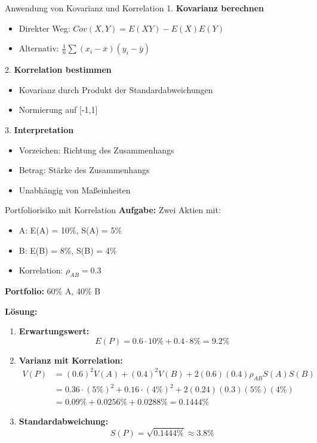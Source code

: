 \begin{KR}{Anwendung von Kovarianz und Korrelation}
1. \textbf{Kovarianz berechnen}
   \begin{itemize}
   \item Direkter Weg: $Cov(X,Y) = E(XY) - E(X)E(Y)$
   \item Alternativ: $\frac{1}{n}\sum(x_i-\bar{x})(y_i-\bar{y})$
   \end{itemize}

2. \textbf{Korrelation bestimmen}
   \begin{itemize}
   \item Kovarianz durch Produkt der Standardabweichungen
   \item Normierung auf [-1,1]
   \end{itemize}

3. \textbf{Interpretation}
   \begin{itemize}
   \item Vorzeichen: Richtung des Zusammenhangs
   \item Betrag: Stärke des Zusammenhangs
   \item Unabhängig von Maßeinheiten
   \end{itemize}
\end{KR}

\begin{example}{Portfoliorisiko mit Korrelation}
\textbf{Aufgabe:} Zwei Aktien mit:
\begin{itemize}
\item A: E(A) = 10\%, S(A) = 5\%
\item B: E(B) = 8\%, S(B) = 4\%
\item Korrelation: $\rho_{AB} = 0.3$
\end{itemize}

\textbf{Portfolio:} 60\% A, 40\% B

\textbf{Lösung:}
\begin{enumerate}
\item \textbf{Erwartungswert:}
   $$E(P) = 0.6 \cdot 10\% + 0.4 \cdot 8\% = 9.2\%$$

\item \textbf{Varianz mit Korrelation:}
   \begin{align*}
   V(P) &= (0.6)^2V(A) + (0.4)^2V(B) + 2(0.6)(0.4)\rho_{AB}S(A)S(B) \\
   &= 0.36 \cdot (5\%)^2 + 0.16 \cdot (4\%)^2 + 2(0.24)(0.3)(5\%)(4\%) \\
   &= 0.09\% + 0.0256\% + 0.0288\% = 0.1444\%
   \end{align*}

\item \textbf{Standardabweichung:}
   $$S(P) = \sqrt{0.1444\%} \approx 3.8\%$$
\end{enumerate}
\end{example}

